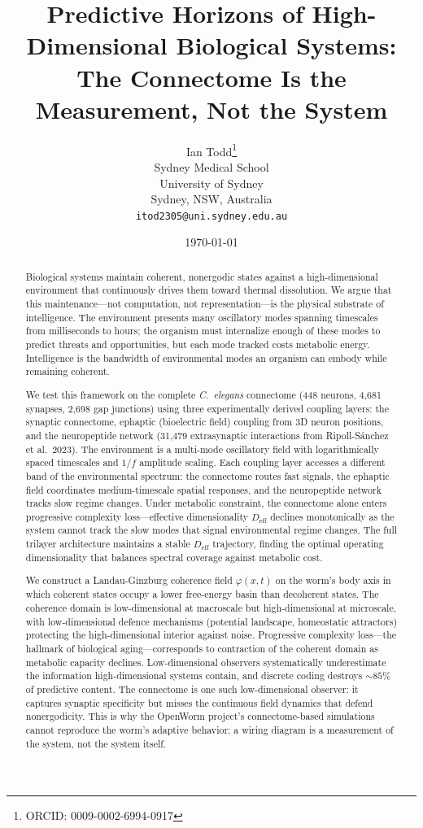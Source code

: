 \documentclass[12pt]{article}
\title{Predictive Horizons of High-Dimensional Biological Systems:\\ The Connectome Is the Measurement, Not the System}
\author{Ian Todd\thanks{ORCID: 0009-0002-6994-0917}\\
Sydney Medical School\\
University of Sydney\\
Sydney, NSW, Australia\\
\texttt{itod2305@uni.sydney.edu.au}}
\date{\today}
\newcommand{\Deff}{D_{\mathrm{eff}}}
\begin{document}
\maketitle

\begin{abstract}
Biological systems maintain coherent, nonergodic states against a high-dimensional environment that continuously drives them toward thermal dissolution. We argue that this maintenance---not computation, not representation---is the physical substrate of intelligence. The environment presents many oscillatory modes spanning timescales from milliseconds to hours; the organism must internalize enough of these modes to predict threats and opportunities, but each mode tracked costs metabolic energy. Intelligence is the bandwidth of environmental modes an organism can embody while remaining coherent.

We test this framework on the complete \textit{C.~elegans} connectome (448 neurons, 4{,}681 synapses, 2{,}698 gap junctions) using three experimentally derived coupling layers: the synaptic connectome, ephaptic (bioelectric field) coupling from 3D neuron positions, and the neuropeptide network (31{,}479 extrasynaptic interactions from Ripoll-S\'anchez et al.\ 2023). The environment is a multi-mode oscillatory field with logarithmically spaced timescales and $1/f$ amplitude scaling. Each coupling layer accesses a different band of the environmental spectrum: the connectome routes fast signals, the ephaptic field coordinates medium-timescale spatial responses, and the neuropeptide network tracks slow regime changes. Under metabolic constraint, the connectome alone enters progressive complexity loss---effective dimensionality $\Deff$ declines monotonically as the system cannot track the slow modes that signal environmental regime changes. The full trilayer architecture maintains a stable $\Deff$ trajectory, finding the optimal operating dimensionality that balances spectral coverage against metabolic cost.

We construct a Landau-Ginzburg coherence field $\varphi(x,t)$ on the worm's body axis in which coherent states occupy a lower free-energy basin than decoherent states. The coherence domain is low-dimensional at macroscale but high-dimensional at microscale, with low-dimensional defence mechanisms (potential landscape, homeostatic attractors) protecting the high-dimensional interior against noise. Progressive complexity loss---the hallmark of biological aging---corresponds to contraction of the coherent domain as metabolic capacity declines. Low-dimensional observers systematically underestimate the information high-dimensional systems contain, and discrete coding destroys ${\sim}85\%$ of predictive content. The connectome is one such low-dimensional observer: it captures synaptic specificity but misses the continuous field dynamics that defend nonergodicity. This is why the OpenWorm project's connectome-based simulations cannot reproduce the worm's adaptive behavior: a wiring diagram is a measurement of the system, not the system itself.
\end{abstract}
\end{document}
